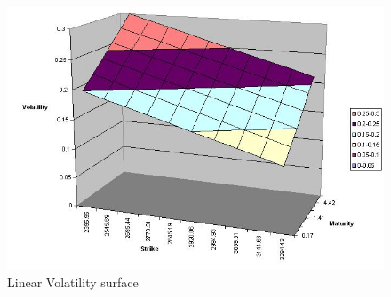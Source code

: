\begin{figure}
\begin{center}
        \includegraphics[width=12cm]{volsurf1.jpg}
        \caption{Linear Volatility surface}
\end{center}
\end{figure}


